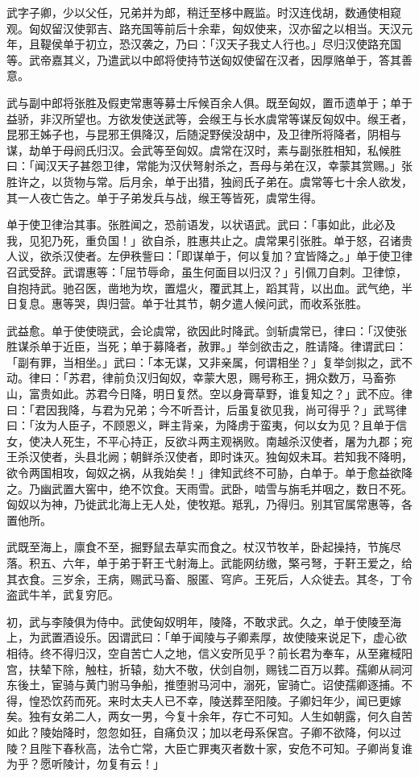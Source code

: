 \documentclass[UTF8,titlepage,oneside]{ctexbook}
\begin{document}
武字子卿，少以父任，兄弟并为郎，稍迁至栘中厩监。时汉连伐胡，数通使相窥观。匈奴留汉使郭吉、路充国等前后十余辈，匈奴使来，汉亦留之以相当。天汉元年，且鞮侯单于初立，恐汉袭之，乃曰：「汉天子我丈人行也。」尽归汉使路充国等。武帝嘉其义，乃遣武以中郎将使持节送匈奴使留在汉者，因厚赂单于，答其善意。


武与副中郎将张胜及假吏常惠等募士斥候百余人俱。既至匈奴，置币遗单于；单于益骄，非汉所望也。方欲发使送武等，会缑王与长水虞常等谋反匈奴中。缑王者，昆邪王姊子也，与昆邪王俱降汉，后随浞野侯没胡中，及卫律所将降者，阴相与谋，劫单于母阏氏归汉。会武等至匈奴。虞常在汉时，素与副张胜相知，私候胜曰：「闻汉天子甚怨卫律，常能为汉伏弩射杀之，吾母与弟在汉，幸蒙其赏赐。」张胜许之，以货物与常。后月余，单于出猎，独阏氏子弟在。虞常等七十余人欲发，其一人夜亡告之。单于子弟发兵与战，缑王等皆死，虞常生得。


单于使卫律治其事。张胜闻之，恐前语发，以状语武。武曰：「事如此，此必及我，见犯乃死，重负国！」欲自杀，胜惠共止之。虞常果引张胜。单于怒，召诸贵人议，欲杀汉使者。左伊秩訾曰：「即谋单于，何以复加？宜皆降之。」单于使卫律召武受辞。武谓惠等：「屈节辱命，虽生何面目以归汉？」引佩刀自刺。卫律惊，自抱持武。驰召医，凿地为坎，置煴火，覆武其上，蹈其背，以出血。武气绝，半日复息。惠等哭，舆归营。单于壮其节，朝夕遣人候问武，而收系张胜。


武益愈。单于使使晓武，会论虞常，欲因此时降武。剑斩虞常已，律曰：「汉使张胜谋杀单于近臣，当死；单于募降者，赦罪。」举剑欲击之，胜请降。律谓武曰：「副有罪，当相坐。」武曰：「本无谋，又非亲属，何谓相坐？」复举剑拟之，武不动。律曰：「苏君，律前负汉归匈奴，幸蒙大恩，赐号称王，拥众数万，马畜弥山，富贵如此。苏君今日降，明日复然。空以身膏草野，谁复知之？」武不应。律曰：「君因我降，与君为兄弟；今不听吾计，后虽复欲见我，尚可得乎？」武骂律曰：「汝为人臣子，不顾恩义，畔主背亲，为降虏于蛮夷，何以女为见？且单于信女，使决人死生，不平心持正，反欲斗两主观祸败。南越杀汉使者，屠为九郡；宛王杀汉使者，头县北阙；朝鲜杀汉使者，即时诛灭。独匈奴未耳。若知我不降明，欲令两国相攻，匈奴之祸，从我始矣！」律知武终不可胁，白单于。单于愈益欲降之。乃幽武置大窖中，绝不饮食。天雨雪。武卧，啮雪与旃毛并咽之，数日不死。匈奴以为神，乃徙武北海上无人处，使牧羝。羝乳，乃得归。别其官属常惠等，各置他所。


武既至海上，廪食不至，掘野鼠去草实而食之。杖汉节牧羊，卧起操持，节旄尽落。积五、六年，单于弟于靬王弋射海上。武能网纺缴，檠弓弩，于靬王爱之，给其衣食。三岁余，王病，赐武马畜、服匿、穹庐。王死后，人众徙去。其冬，丁令盗武牛羊，武复穷厄。


初，武与李陵俱为侍中。武使匈奴明年，陵降，不敢求武。久之，单于使陵至海上，为武置酒设乐。因谓武曰：「单于闻陵与子卿素厚，故使陵来说足下，虚心欲相待。终不得归汉，空自苦亡人之地，信义安所见乎？前长君为奉车，从至雍棫阳宫，扶辇下除，触柱，折辕，劾大不敬，伏剑自刎，赐钱二百万以葬。孺卿从祠河东後土，宦骑与黄门驸马争船，推堕驸马河中，溺死，宦骑亡。诏使孺卿逐捕。不得，惶恐饮药而死。来时太夫人已不幸，陵送葬至阳陵。子卿妇年少，闻已更嫁矣。独有女弟二人，两女一男，今复十余年，存亡不可知。人生如朝露，何久自苦如此？陵始降时，忽忽如狂，自痛负汉；加以老母系保宫。子卿不欲降，何以过陵？且陛下春秋高，法令亡常，大臣亡罪夷灭者数十家，安危不可知。子卿尚复谁为乎？愿听陵计，勿复有云！」
\end{document}
